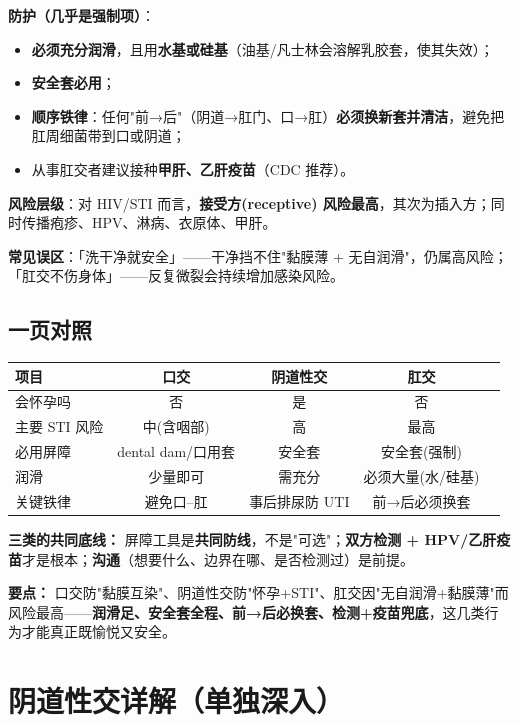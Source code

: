 \documentclass[12pt,UTF8,openany]{ctexbook}
\begin{document}
\textbf{防护（几乎是强制项）}：
\begin{itemize}[leftmargin=2em,itemsep=0.3em]
  \item \textbf{必须充分润滑}，且用\textbf{水基或硅基}（油基/凡士林会溶解乳胶套，使其失效）；
  \item \textbf{安全套必用}；
  \item \textbf{顺序铁律}：任何"前→后"（阴道→肛门、口→肛）\textbf{必须换新套并清洁}，避免把肛周细菌带到口或阴道；
  \item 从事肛交者建议接种\textbf{甲肝、乙肝疫苗}（CDC 推荐）。
\end{itemize}

\textbf{风险层级}：对 HIV/STI 而言，\textbf{接受方(receptive) 风险最高}，其次为插入方；同时传播疱疹、HPV、淋病、衣原体、甲肝。

\textbf{常见误区}：「洗干净就安全」——干净挡不住"黏膜薄 + 无自润滑"，仍属高风险；「肛交不伤身体」——反复微裂会持续增加感染风险。

\section{一页对照}

\begin{tabularx}{\textwidth}{lCCCC}
\toprule
项目 & 口交 & 阴道性交 & 肛交 \\
\midrule
会怀孕吗 & 否 & 是 & 否 \\
主要 STI 风险 & 中(含咽部) & 高 & 最高 \\
必用屏障 & dental dam/口用套 & 安全套 & 安全套(强制) \\
润滑 & 少量即可 & 需充分 & 必须大量(水/硅基) \\
关键铁律 & 避免口--肛 & 事后排尿防 UTI & 前→后必须换套 \\
\bottomrule
\end{tabularx}

\vspace{1em}
\noindent\textbf{三类的共同底线：} 屏障工具是\textbf{共同防线}，不是"可选"；\textbf{双方检测 + HPV/乙肝疫苗}才是根本；\textbf{沟通}（想要什么、边界在哪、是否检测过）是前提。

\noindent\textbf{要点：} 口交防"黏膜互染"、阴道性交防"怀孕+STI"、肛交因"无自润滑+黏膜薄"而风险最高——\textbf{润滑足、安全套全程、前→后必换套、检测+疫苗兜底}，这几类行为才能真正既愉悦又安全。

\chapter{阴道性交详解（单独深入）}
\label{chap:vaginal}
\end{document}
